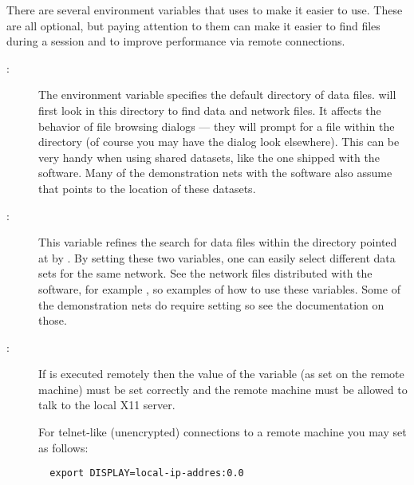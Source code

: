 There are several environment variables that \sr{} uses to make it easier
to use.  These are all optional, but paying attention to them can make it
easier to find files during a \sr{} session and to improve performance via
remote connections.

\begin{description}
  \item[{}\mbox{}: ]\mbox{}
        \label{sec:scirundata}
        The environment variable  specifies the
        default directory of \sr{} data files.  \sr{} will first look
        in this directory to find data and network files.  It affects
        the behavior of file browsing dialogs --- they will prompt for
        a file within the  directory (of course
        you may have the dialog look elsewhere).  This can be very
        handy when using shared datasets, like the one shipped with
        the software.  Many of the demonstration nets with the
        software also assume that  points to the
        location of these datasets.

  \item[\mbox{}: ]\mbox{}
        \label{sec:scirundataset} 
        This variable refines the search for data files within the
        directory pointed at by .  By setting
        these two variables, one can easily select different data sets
        for the same network.  See the network files distributed with
        the software, for example , so
        examples of how to use these variables.  Some of the
        demonstration nets do require setting 
        so see the documentation on those.

      \item[: ]\mbox{}
        
        If \sr is executed remotely then the value of the
         variable (as set on the remote machine) must
        be set correctly and the remote machine must be allowed to
        talk to the local X11 server.
        
        For telnet-like (unencrypted) connections to a remote machine
        you may set  as follows:

\begin{verbatim}
  export DISPLAY=local-ip-addres:0.0
\end{verbatim}
        

\end{description}

